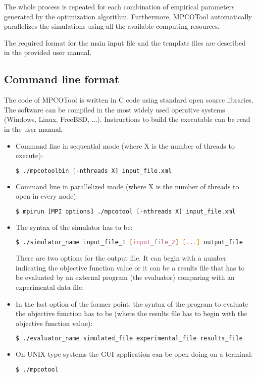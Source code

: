 \documentclass[review,authoryear]{elsarticle}
\begin{document}
The whole process is repeated for each combination of empirical parameters generated by the optimization algorithm. Furthermore, MPCOTool automatically parallelizes the simulations using all the available computing resources.

The required format for the main input file and the template files are described in the provided user manual.

\subsection{Command line format}

The code of MPCOTool is written in C code using standard open source libraries. The software can be compiled in the most widely used operative systems (Windows, Linux, FreeBSD, ...). Instructions to build the executable can be read in the user manual.

\begin{itemize}

\item Command line in sequential mode (where X is the number of threads to
execute):
\begin{lstlisting}[language=bash,basicstyle=\scriptsize]
$ ./mpcotoolbin [-nthreads X] input_file.xml
\end{lstlisting}

\item Command line in parallelized mode (where X is the number of threads to
open in every node):
\begin{lstlisting}[language=bash,basicstyle=\scriptsize]
$ mpirun [MPI options] ./mpcotool [-nthreads X] input_file.xml
\end{lstlisting}

\item The syntax of the simulator has to be:
\begin{lstlisting}[language=bash,basicstyle=\scriptsize]
$ ./simulator_name input_file_1 [input_file_2] [...] output_file
\end{lstlisting}
There are two options for the output file. It can begin with a number indicating
the objective function value or it can be a results file that has to be
evaluated by an external program (the evaluator) comparing with an experimental
data file.

\item In the last option of the former point, the syntax of the program to
evaluate the objective function has to be (where the results file has to begin
with the objective function value):
\begin{lstlisting}[language=bash,basicstyle=\scriptsize]
$ ./evaluator_name simulated_file experimental_file results_file
\end{lstlisting}

\item On UNIX type systems the GUI application can be open doing on a terminal:
\begin{lstlisting}[language=bash,basicstyle=\scriptsize]
$ ./mpcotool
\end{lstlisting}

\end{itemize}
\end{document}
